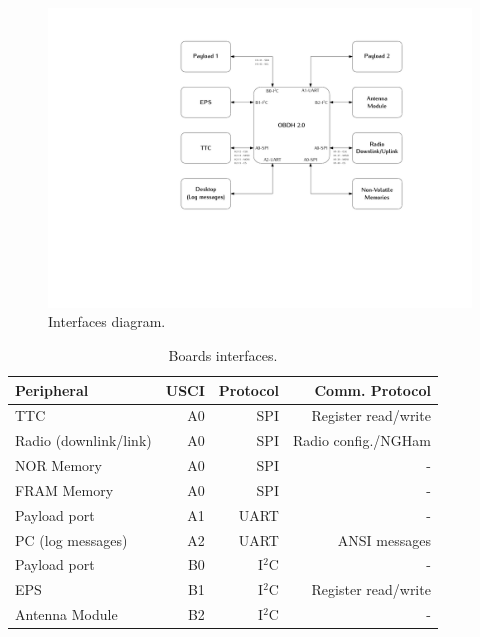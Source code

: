 \begin{figure}[!ht]
    \begin{center}
        \includegraphics[width=\textwidth]{figures/diagram_interfaces.pdf}
        \caption{Interfaces diagram.}
        \label{fig:diagram-interfaces}
    \end{center}
\end{figure}


\begin{table}[!ht]
    \centering
    \begin{tabular}{lrrr}
        \toprule[1.5pt]
        \textbf{Peripheral}     & \textbf{USCI} & \textbf{Protocol} & \textbf{Comm. Protocol} \\
        \midrule
        TTC                     & A0            & SPI               & Register read/write \\
        Radio (downlink/link)   & A0            & SPI               & Radio config./NGHam \\
        NOR Memory              & A0            & SPI               & - \\
        FRAM Memory             & A0            & SPI               & - \\
        Payload port            & A1            & UART              & -\footnotemark[1] \\
        PC (log messages)       & A2            & UART              & ANSI messages \\
        Payload port            & B0            & I$^{2}$C          & -\footnotemark[1] \\
        EPS                     & B1            & I$^{2}$C          & Register read/write \\
        Antenna Module          & B2            & I$^{2}$C          & - \\
        \bottomrule[1.5pt]
    \end{tabular}
    \caption{Boards interfaces.}
    \label{tab:interfaces}
\end{table}


